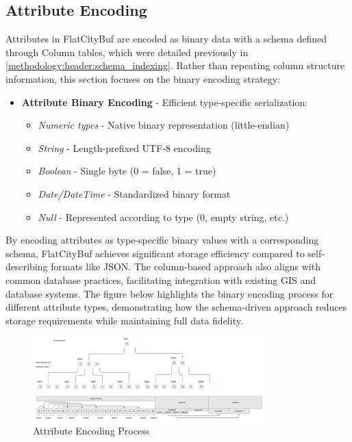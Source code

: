 \subsection{Attribute Encoding}
\label{methodology:feature_encoding:attribute_encoding}

Attributes in FlatCityBuf are encoded as binary data with a schema defined through Column tables, which were detailed previously in \autoref{methodology:header:schema_indexing}. Rather than repeating column structure information, this section focuses on the binary encoding strategy:

\begin{itemize}
  \item \textbf{Attribute Binary Encoding} - Efficient type-specific serialization:
    \begin{itemize}
      \item \textit{Numeric types} - Native binary representation (little-endian)
      \item \textit{String} - Length-prefixed UTF-8 encoding
      \item \textit{Boolean} - Single byte (0 = false, 1 = true)
      \item \textit{Date/DateTime} - Standardized binary format
      \item \textit{Null} - Represented according to type (0, empty string, etc.)
    \end{itemize}
\end{itemize}

By encoding attributes as type-specific binary values with a corresponding schema, FlatCityBuf achieves significant storage efficiency compared to self-describing formats like JSON. The column-based approach also aligns with common database practices, facilitating integration with existing GIS and database systems. The figure below highlights the binary encoding process for different attribute types, demonstrating how the schema-driven approach reduces storage requirements while maintaining full data fidelity.

\begin{figure}[htbp]
  \centering
  \includegraphics[width=0.8\textwidth]{figs/methodology/attribute_index.png}
  \caption{Attribute Encoding Process}
  \label{methodology:feature_encoding:attribute_encoding:figure}
\end{figure}

